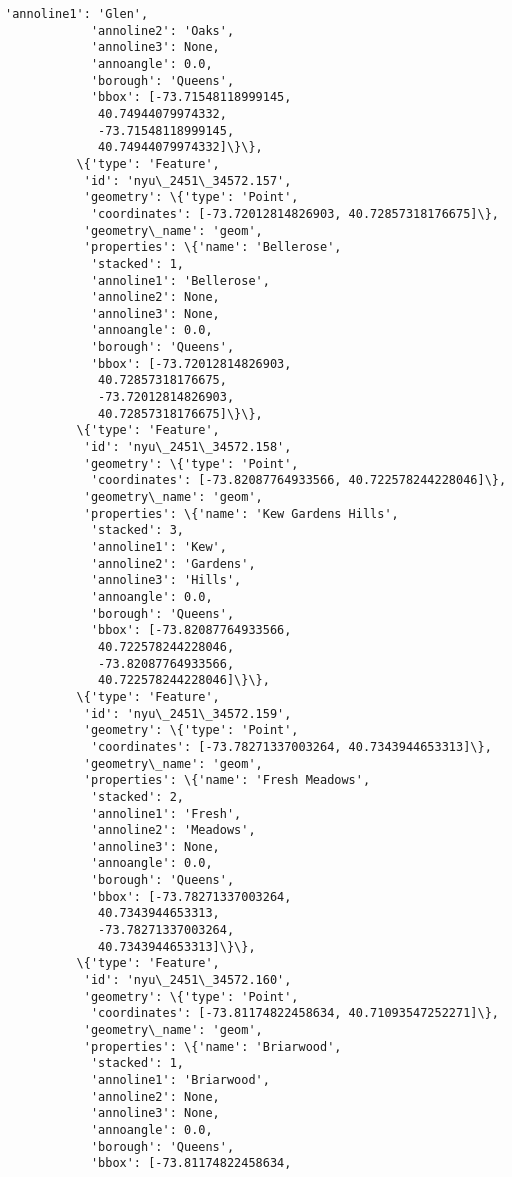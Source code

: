 \documentclass[11pt]{article}
\begin{document}
\begin{Verbatim}[commandchars=\\\{\}]
            'annoline1': 'Glen',
            'annoline2': 'Oaks',
            'annoline3': None,
            'annoangle': 0.0,
            'borough': 'Queens',
            'bbox': [-73.71548118999145,
             40.74944079974332,
             -73.71548118999145,
             40.74944079974332]\}\},
          \{'type': 'Feature',
           'id': 'nyu\_2451\_34572.157',
           'geometry': \{'type': 'Point',
            'coordinates': [-73.72012814826903, 40.72857318176675]\},
           'geometry\_name': 'geom',
           'properties': \{'name': 'Bellerose',
            'stacked': 1,
            'annoline1': 'Bellerose',
            'annoline2': None,
            'annoline3': None,
            'annoangle': 0.0,
            'borough': 'Queens',
            'bbox': [-73.72012814826903,
             40.72857318176675,
             -73.72012814826903,
             40.72857318176675]\}\},
          \{'type': 'Feature',
           'id': 'nyu\_2451\_34572.158',
           'geometry': \{'type': 'Point',
            'coordinates': [-73.82087764933566, 40.722578244228046]\},
           'geometry\_name': 'geom',
           'properties': \{'name': 'Kew Gardens Hills',
            'stacked': 3,
            'annoline1': 'Kew',
            'annoline2': 'Gardens',
            'annoline3': 'Hills',
            'annoangle': 0.0,
            'borough': 'Queens',
            'bbox': [-73.82087764933566,
             40.722578244228046,
             -73.82087764933566,
             40.722578244228046]\}\},
          \{'type': 'Feature',
           'id': 'nyu\_2451\_34572.159',
           'geometry': \{'type': 'Point',
            'coordinates': [-73.78271337003264, 40.7343944653313]\},
           'geometry\_name': 'geom',
           'properties': \{'name': 'Fresh Meadows',
            'stacked': 2,
            'annoline1': 'Fresh',
            'annoline2': 'Meadows',
            'annoline3': None,
            'annoangle': 0.0,
            'borough': 'Queens',
            'bbox': [-73.78271337003264,
             40.7343944653313,
             -73.78271337003264,
             40.7343944653313]\}\},
          \{'type': 'Feature',
           'id': 'nyu\_2451\_34572.160',
           'geometry': \{'type': 'Point',
            'coordinates': [-73.81174822458634, 40.71093547252271]\},
           'geometry\_name': 'geom',
           'properties': \{'name': 'Briarwood',
            'stacked': 1,
            'annoline1': 'Briarwood',
            'annoline2': None,
            'annoline3': None,
            'annoangle': 0.0,
            'borough': 'Queens',
            'bbox': [-73.81174822458634,

\end{Verbatim}
\end{document}

